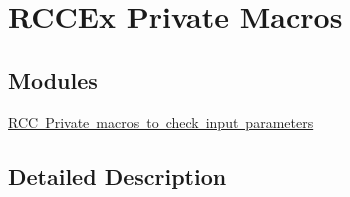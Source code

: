 \hypertarget{group___r_c_c_ex___private___macros}{}\section{R\+C\+C\+Ex Private Macros}
\label{group___r_c_c_ex___private___macros}
\subsection*{Modules}
\begin{DoxyCompactItemize}
\item 
\mbox{\hyperlink{group___r_c_c_ex___i_s___r_c_c___definitions}{R\+C\+C Private macros to check input parameters}}
\end{DoxyCompactItemize}


\subsection{Detailed Description}
